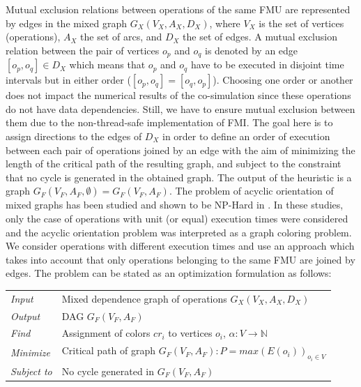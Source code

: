 Mutual exclusion relations between operations of the same  FMU are represented by edges in the mixed graph $G_X(V_X,A_X,D_X)$, where $V_X$ is the set of vertices (operations), $A_X$ the set of arcs, and $D_X$ the set of edges. A mutual exclusion relation between the pair of vertices $o_p$ and $o_q$ is denoted by an edge $[o_p,o_q] \in D_X$ which means that $o_p$ and $o_q$ have to be executed in disjoint time intervals but in either order ($[o_p,o_q]=[o_q,o_p]$). Choosing one order or another does not impact the numerical results of the co-simulation since these operations do not have data dependencies. Still, we have to ensure mutual exclusion between them due to the non-thread-safe implementation of FMI. The goal here is to assign directions to the edges of $D_X$ in order to define an order of execution between each pair of operations joined by an edge with the aim of minimizing the length of the critical path of the resulting graph, and subject to the constraint that no cycle is generated in the obtained graph. The output of the heuristic is a graph $G_F(V_F,A_F,\emptyset) = G_F(V_F,A_F)$. The problem of acyclic orientation of mixed graphs has been studied and shown to be NP-Hard in \cite{andreev:2000,sotskov:2002,al-anzi:2006}. In these studies, only the case of operations with unit (or equal) execution times were considered and the acyclic orientation problem was interpreted as a graph coloring problem. We consider operations with different execution times and use an approach which takes into account that only operations belonging to the same FMU are joined by edges. The problem can be stated as an optimization formulation as follows:

\begin{table}[h]
\centering
\begin{tabular}{l  l}
	
  \textit{Input} & Mixed dependence graph of operations $G_X(V_X,A_X,D_X)$\\
	\rule{0pt}{5ex}									  
	
  \textit{Output} & DAG $G_F(V_F,A_F)$\\
	\rule{0pt}{5ex}									  
  
	\textit{Find} & Assignment of colors $cr_i$ to vertices $o_i$, $\alpha: V \rightarrow \mathbb{N}$\\
	\rule{0pt}{5ex}									 
	
	\textit{Minimize} & Critical path of graph $G_F(V_F,A_F): P = max(E(o_i))_{o_i \in V}$\\
	\rule{0pt}{5ex}									 
	
	\textit{Subject to} & No cycle generated in $G_F(V_F,A_F)$\\
										 
\end{tabular}
\end{table}

